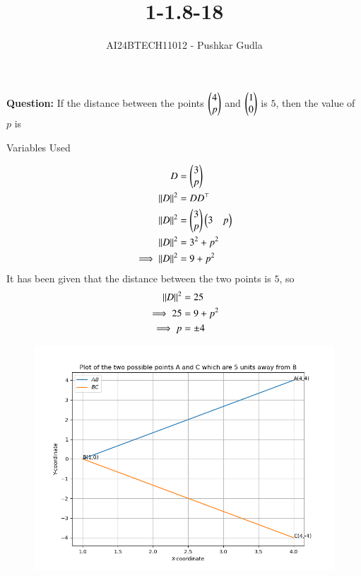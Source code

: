 \documentclass[journal]{IEEEtran}
\begin{document}

\vspace{3cm}

\title{1-1.8-18}
\author{AI24BTECH11012 - Pushkar Gudla}
{\let\newpage\relax\maketitle}

\renewcommand{\thefigure}{\theenumi}
\renewcommand{\thetable}{\theenumi}
\setlength{\intextsep}{10pt} %


\renewcommand{\thetable}{\theenumi}
\textbf{Question:} If the distance between the points $\begin{pmatrix}4\\p\end{pmatrix}$ and $\begin{pmatrix}1\\0\end{pmatrix}$ is $5$, then the value of $p$ is
\solution
\begin{table}[h!]    
  \centering
  
  \caption{Variables Used}
  \label{tab 1.8.18}
\end{table}
\begin{align}
	D	&= \begin{pmatrix}3\\p\end{pmatrix} \\
	\left\lVert D\right\rVert^2 &= DD^\top \\
	\left\lVert D\right\rVert^2 &= \begin{pmatrix}3\\p\end{pmatrix}\begin{pmatrix}3 & p\end{pmatrix} \\
	\left\lVert D\right\rVert^2 &= 3^2 + p^2 \\
	\implies \left\lVert D\right\rVert^2 &= 9 + p^2
\end{align}
It has been given that the distance between the two points is $5$, so \\
\begin{align}
	\left\lVert D\right\rVert^2 &= 25 \\
	\implies 25 &= 9 + p^2 \\
	\implies p &= \pm 4
\end{align}
\begin{figure}[h]
	\centering
	\includegraphics[scale=0.6]{figs/plot.png}
	\label{Fig}
\end{figure}
\end{document}
